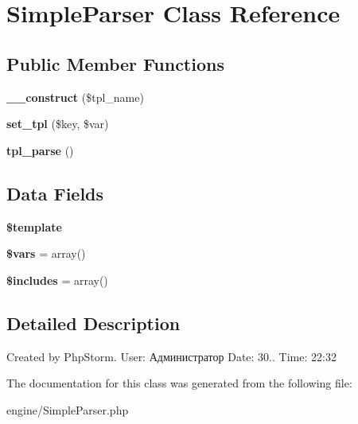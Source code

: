 \hypertarget{class_simple_parser}{}\section{Simple\+Parser Class Reference}
\label{class_simple_parser}
\subsection*{Public Member Functions}
\begin{DoxyCompactItemize}
\item 
\hypertarget{class_simple_parser_a1e9283d83ca3c72474bcc0e62074be7f}{}{\bfseries \+\_\+\+\_\+construct} (\$tpl\+\_\+name)\label{class_simple_parser_a1e9283d83ca3c72474bcc0e62074be7f}

\item 
\hypertarget{class_simple_parser_a4571848dce8d7436cce1daa3c2e1a1ee}{}{\bfseries set\+\_\+tpl} (\$key, \$var)\label{class_simple_parser_a4571848dce8d7436cce1daa3c2e1a1ee}

\item 
\hypertarget{class_simple_parser_ab934c7a2caeb6a82cbedb365ce6ead1c}{}{\bfseries tpl\+\_\+parse} ()\label{class_simple_parser_ab934c7a2caeb6a82cbedb365ce6ead1c}

\end{DoxyCompactItemize}
\subsection*{Data Fields}
\begin{DoxyCompactItemize}
\item 
\hypertarget{class_simple_parser_aa3e9534005fd516d941f6a5569896e01}{}{\bfseries \$template}\label{class_simple_parser_aa3e9534005fd516d941f6a5569896e01}

\item 
\hypertarget{class_simple_parser_a09f2c833c130b4443725fb576d9d5269}{}{\bfseries \$vars} = array()\label{class_simple_parser_a09f2c833c130b4443725fb576d9d5269}

\item 
\hypertarget{class_simple_parser_a32d017dad1664a5d9e0392a04d7f543c}{}{\bfseries \$includes} = array()\label{class_simple_parser_a32d017dad1664a5d9e0392a04d7f543c}

\end{DoxyCompactItemize}


\subsection{Detailed Description}
Created by Php\+Storm. User\+: Администратор Date\+: 30.. Time\+: 22\+:32 

The documentation for this class was generated from the following file\+:\begin{DoxyCompactItemize}
\item 
engine/Simple\+Parser.\+php\end{DoxyCompactItemize}
